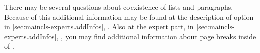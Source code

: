\begin{Explain}
  There may be several questions about coexistence of lists and
  paragraphs. Because of this additional information may be found at the
  description of option  in
  \autoref{sec:maincls-experts.addInfos},
  . Also at the expert part,
  in \autoref{sec:maincls-experts.addInfos},
  , you may find additional
  information about page breaks inside of .%
\end{Explain}%
\fi%
%
%
%
%
\fi %


